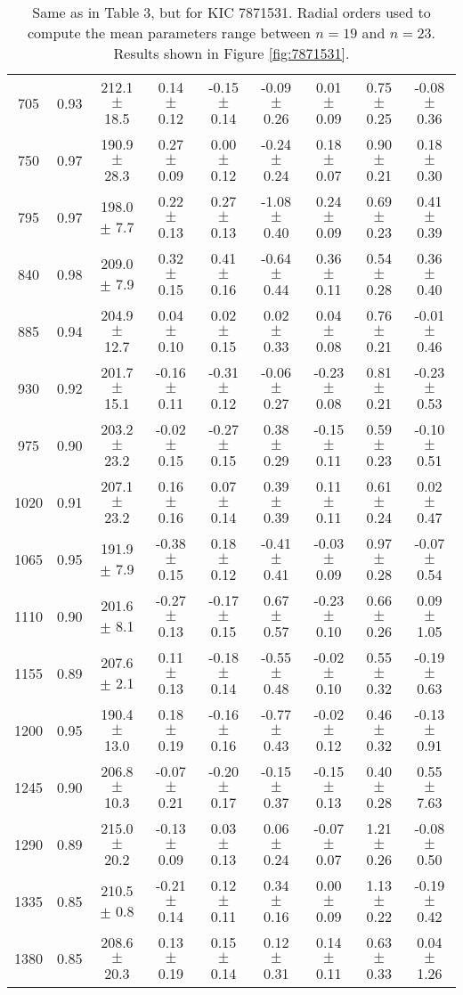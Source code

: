 \documentclass[twocolumn]{aastex61}%
\begin{document}
\begin{table}[ht]
\begin{tabular}{ccc|ccccc|c}
705 & 0.93 & 212.1 $\pm$ 18.5 & 0.14 $\pm$ 0.12 & -0.15 $\pm$ 0.14 & -0.09 $\pm$ 0.26 & 0.01 $\pm$ 0.09 & 0.75 $\pm$ 0.25 & -0.08 $\pm$ 0.36\\
750 & 0.97 & 190.9 $\pm$ 28.3 & 0.27 $\pm$ 0.09 & 0.00 $\pm$ 0.12 & -0.24 $\pm$ 0.24 & 0.18 $\pm$ 0.07 & 0.90 $\pm$ 0.21 & 0.18 $\pm$ 0.30\\
795 & 0.97 & 198.0 $\pm$ 7.7 & 0.22 $\pm$ 0.13 & 0.27 $\pm$ 0.13 & -1.08 $\pm$ 0.40 & 0.24 $\pm$ 0.09 & 0.69 $\pm$ 0.23 & 0.41 $\pm$ 0.39\\
840 & 0.98 & 209.0 $\pm$ 7.9 & 0.32 $\pm$ 0.15 & 0.41 $\pm$ 0.16 & -0.64 $\pm$ 0.44 & 0.36 $\pm$ 0.11 & 0.54 $\pm$ 0.28 & 0.36 $\pm$ 0.40\\
885 & 0.94 & 204.9 $\pm$ 12.7 & 0.04 $\pm$ 0.10 & 0.02 $\pm$ 0.15 & 0.02 $\pm$ 0.33 & 0.04 $\pm$ 0.08 & 0.76 $\pm$ 0.21 & -0.01 $\pm$ 0.46\\
930 & 0.92 & 201.7 $\pm$ 15.1 & -0.16 $\pm$ 0.11 & -0.31 $\pm$ 0.12 & -0.06 $\pm$ 0.27 & -0.23 $\pm$ 0.08 & 0.81 $\pm$ 0.21 & -0.23 $\pm$ 0.53\\
975 & 0.90 & 203.2 $\pm$ 23.2 & -0.02 $\pm$ 0.15 & -0.27 $\pm$ 0.15 & 0.38 $\pm$ 0.29 & -0.15 $\pm$ 0.11 & 0.59 $\pm$ 0.23 & -0.10 $\pm$ 0.51\\
1020 & 0.91 & 207.1 $\pm$ 23.2 & 0.16 $\pm$ 0.16 & 0.07 $\pm$ 0.14 & 0.39 $\pm$ 0.39 & 0.11 $\pm$ 0.11 & 0.61 $\pm$ 0.24 & 0.02 $\pm$ 0.47\\
1065 & 0.95 & 191.9 $\pm$ 7.9 & -0.38 $\pm$ 0.15 & 0.18 $\pm$ 0.12 & -0.41 $\pm$ 0.41 & -0.03 $\pm$ 0.09 & 0.97 $\pm$ 0.28 & -0.07 $\pm$ 0.54\\
1110 & 0.90 & 201.6 $\pm$ 8.1 & -0.27 $\pm$ 0.13 & -0.17 $\pm$ 0.15 & 0.67 $\pm$ 0.57 & -0.23 $\pm$ 0.10 & 0.66 $\pm$ 0.26 & 0.09 $\pm$ 1.05\\
1155 & 0.89 & 207.6 $\pm$ 2.1 & 0.11 $\pm$ 0.13 & -0.18 $\pm$ 0.14 & -0.55 $\pm$ 0.48 & -0.02 $\pm$ 0.10 & 0.55 $\pm$ 0.32 & -0.19 $\pm$ 0.63\\
1200 & 0.95 & 190.4 $\pm$ 13.0 & 0.18 $\pm$ 0.19 & -0.16 $\pm$ 0.16 & -0.77 $\pm$ 0.43 & -0.02 $\pm$ 0.12 & 0.46 $\pm$ 0.32 & -0.13 $\pm$ 0.91\\
1245 & 0.90 & 206.8 $\pm$ 10.3 & -0.07 $\pm$ 0.21 & -0.20 $\pm$ 0.17 & -0.15 $\pm$ 0.37 & -0.15 $\pm$ 0.13 & 0.40 $\pm$ 0.28 & 0.55 $\pm$ 7.63\\
1290 & 0.89 & 215.0 $\pm$ 20.2 & -0.13 $\pm$ 0.09 & 0.03 $\pm$ 0.13 & 0.06 $\pm$ 0.24 & -0.07 $\pm$ 0.07 & 1.21 $\pm$ 0.26 & -0.08 $\pm$ 0.50\\
1335 & 0.85 & 210.5 $\pm$ 0.8 & -0.21 $\pm$ 0.14 & 0.12 $\pm$ 0.11 & 0.34 $\pm$ 0.16 & 0.00 $\pm$ 0.09 & 1.13 $\pm$ 0.22 & -0.19 $\pm$ 0.42\\
1380 & 0.85 & 208.6 $\pm$ 20.3 & 0.13 $\pm$ 0.19 & 0.15 $\pm$ 0.14 & 0.12 $\pm$ 0.31 & 0.14 $\pm$ 0.11 & 0.63 $\pm$ 0.33 & 0.04 $\pm$ 1.26\\
\end{tabular}
\parbox{2\hsize}{\caption{Same as in Table 3, but for KIC 7871531. Radial orders used to compute the mean parameters range between $n=19$ and $n=23$. Results shown in Figure \ref{fig:7871531}.}\label{tab:7871531}}
\end{table}
\end{document}
